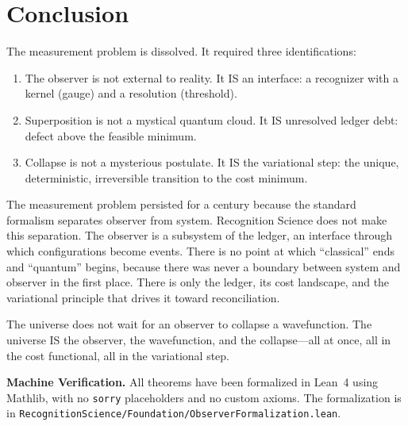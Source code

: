 \documentclass[11pt,a4paper]{article}
\theoremstyle{plain}
\theoremstyle{definition}
\theoremstyle{remark}
\begin{document}
\section{Conclusion}\label{sec:conclusion}

The measurement problem is dissolved.
It required three identifications:

\begin{enumerate}[nosep]
\item The observer is not external to reality.
It IS an interface: a recognizer with a kernel (gauge) and a resolution (threshold).
\item Superposition is not a mystical quantum cloud.
It IS unresolved ledger debt: defect above the feasible minimum.
\item Collapse is not a mysterious postulate.
It IS the variational step: the unique, deterministic, irreversible transition to the cost minimum.
\end{enumerate}

The measurement problem persisted for a century because the standard formalism separates observer from system.
Recognition Science does not make this separation.
The observer is a subsystem of the ledger, an interface through which configurations become events.
There is no point at which ``classical'' ends and ``quantum'' begins, because there was never a boundary between system and observer in the first place.
There is only the ledger, its cost landscape, and the variational principle that drives it toward reconciliation.

The universe does not wait for an observer to collapse a wavefunction.
The universe IS the observer, the wavefunction, and the collapse---all at once, all in the cost functional, all in the variational step.

\bigskip

\noindent\textbf{Machine Verification.}\quad
All theorems have been formalized in Lean~4 using Mathlib, with no \texttt{sorry} placeholders and no custom axioms.
The formalization is in \texttt{RecognitionScience/Foundation/ObserverFormalization.lean}.

\bigskip
\end{document}
